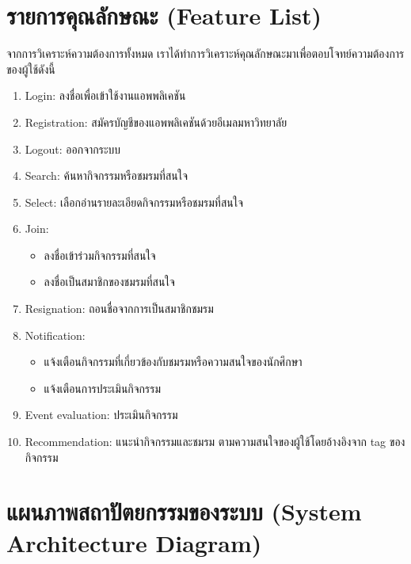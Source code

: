 \documentclass[14pt,oneside,openright,a4paper]{cpe-thai-project}
\begin{document}
\section{รายการคุณลักษณะ (Feature List)}
  จากการวิเคราะห์ความต้องการทั้งหมด เราได้ทำการวิเคราะห์คุณลักษณะมาเพื่อตอบโจทย์ความต้องการของผู้ใช้ดังนี้
\begin{enumerate}
  \item Login: ลงชื่อเพื่อเข้าใช้งานแอพพลิเคชัน
  \item Registration: สมัครบัญชีของแอพพลิเคชันด้วยอีเมลมหาวิทยาลัย
  \item Logout: ออกจากระบบ
  \item Search: ค้นหากิจกรรมหรือชมรมที่สนใจ
  \item Select: เลือกอ่านรายละเอียดกิจกรรมหรือชมรมที่สนใจ
  \item Join: 
  \begin{itemize}
    \item ลงชื่อเข้าร่วมกิจกรรมที่สนใจ
    \item ลงชื่อเป็นสมาชิกของชมรมที่สนใจ
  \end{itemize}
  \item Resignation: ถอนชื่อจากการเป็นสมาชิกชมรม
  \item Notification: 
  \begin{itemize}
    \item แจ้งเตือนกิจกรรมที่เกี่ยวข้องกับชมรมหรือความสนใจของนักศึกษา
    \item แจ้งเตือนการประเมินกิจกรรม
  \end{itemize}
  \item Event evaluation: ประเมินกิจกรรม
  \item Recommendation: แนะนำกิจกรรมและชมรม ตามความสนใจของผู้ใช้โดยอ้างอิงจาก tag ของกิจกรรม
\end{enumerate}

\newpage

\section{แผนภาพสถาปัตยกรรมของระบบ (System Architecture Diagram)}
\end{document}
